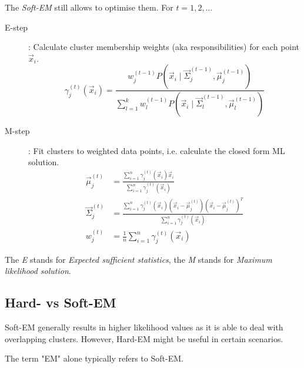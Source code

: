 The \emph{Soft-EM} still allows to optimise them.
For $t = 1, 2, \dotsc$
\begin{description}
    \item[E-step]: Calculate cluster membership weights
    (aka responsibilities)
    for each point $\vec{x}_i$.
    \begin{equation*}
        \gamma_j^{(t)}(\vec{x}_i) = \frac{
            w_j^{(t-1)} P(\vec{x}_i \mid \vec{\Sigma}_j^{(t-1)}, \vec{\mu}_j^{(t-1)})
        }{
            \sum_{l=1}^k{
                w_l^{(t-1)} P(\vec{x}_i \mid \vec{\Sigma}_l^{(t-1)}, \vec{\mu}_l^{(t-1)})
            }
        }
    \end{equation*}
    \item[M-step]: Fit clusters to weighted data points,
    i.e. calculate the closed form ML solution.
    \begin{align*}
        \vec{\mu}^{(t)}_j
        &= \frac{\sum_{i=1}^n{\gamma_j^{(t)}(\vec{x}_i) \vec{x}_i}}{\sum_{i=1}^n{\gamma_j^{(t)}(\vec{x}_i)}} \\
        \vec{\Sigma}^{(t)}_j &= \frac{
        \sum_{i=1}^n{
        \gamma_j^{(t)}(\vec{x}_i) (\vec{x}_i - \vec{\mu}_j^{(t)}) (\vec{x}_i - \vec{\mu}_j^{(t)})^T
        }
        }{
            \sum_{i=1}^n{\gamma_j^{(t)}(\vec{x}_i)}
        }
        \\
        w_j^{(t)} &= \frac{1}{n} \sum_{i=1}^n{\gamma_j^{(t)}(\vec{x}_i)}
    \end{align*}
\end{description}
The \emph{E} stands for \emph{Expected sufficient statistics},
the \emph{M} stands for \emph{Maximum likelihood solution}.


\subsection{Hard- vs Soft-EM}
Soft-EM generally results in higher likelihood values
as it is able to deal with overlapping clusters.
However, Hard-EM might be useful in certain scenarios.

The term "EM" alone typically refers to Soft-EM.


